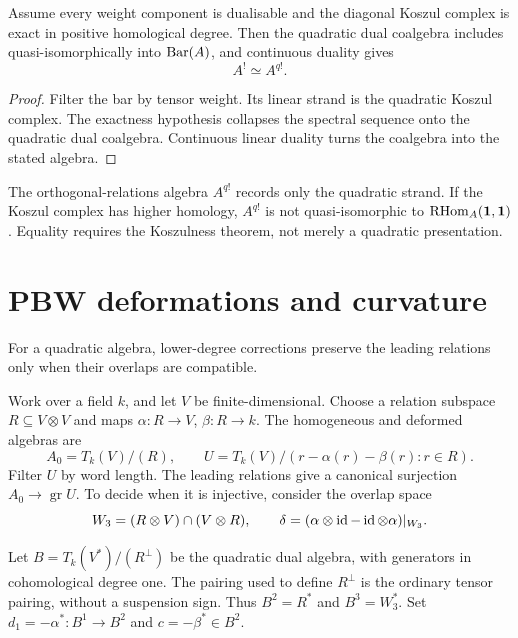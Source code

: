 \begin{theorem}\label{thm:quadratic-recognition}
Assume every weight component is dualisable and the diagonal Koszul complex is exact in positive homological degree.  Then the quadratic dual coalgebra includes quasi-isomorphically into \(\operatorname{Bar}(A)\), and continuous duality gives
\[
 A^!\simeq A^{q!}.
\]
\end{theorem}
\begin{proof}
Filter the bar by tensor weight.  Its linear strand is the quadratic Koszul complex.  The exactness hypothesis collapses the spectral sequence onto the quadratic dual coalgebra.  Continuous linear duality turns the coalgebra into the stated algebra.
\end{proof}

\begin{nogobox}[title={No-go theorem 11: quadratic dual is not automatically derived Koszul dual}]
The orthogonal-relations algebra \(A^{q!}\) records only the quadratic strand.  If the Koszul complex has higher homology, \(A^{q!}\) is not quasi-isomorphic to \(\operatorname{RHom}_A(\mathbf 1,\mathbf 1)\).  Equality requires the Koszulness theorem, not merely a quadratic presentation.
\end{nogobox}

\section{PBW deformations and curvature}
For a quadratic algebra, lower-degree corrections preserve the leading relations only when their overlaps are compatible.

Work over a field $k$, and let $V$ be finite-dimensional.
Choose a relation subspace $R\subseteq V\otimes V$ and maps
$\alpha:R\to V$, $\beta:R\to k$.
The homogeneous and deformed algebras are
\[
 A_0=T_k(V)/(R),\qquad
 U=T_k(V)/(r-\alpha(r)-\beta(r):r\in R).
\]
Filter $U$ by word length.
The leading relations give a canonical surjection $A_0\to\operatorname{gr}U$.
To decide when it is injective, consider the overlap space
\[
 W_3=(R\otimes V)\cap(V\otimes R),\qquad
 \delta=(\alpha\otimes\operatorname{id}-\operatorname{id}\otimes\alpha)|_{W_3}.
\]

Let $B=T_k(V^*)/(R^\perp)$ be the quadratic dual algebra, with generators in cohomological degree one.
The pairing used to define $R^\perp$ is the ordinary tensor pairing, without a suspension sign.
Thus $B^2=R^*$ and $B^3=W_3^*$.
Set $d_1=-\alpha^*:B^1\to B^2$ and $c=-\beta^*\in B^2$.

